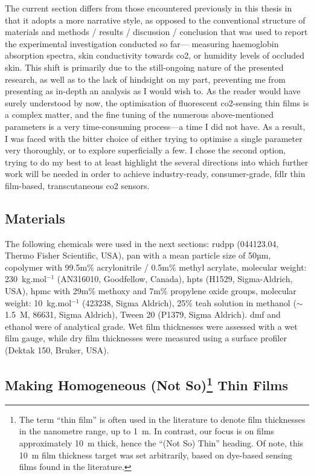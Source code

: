 The current section differs from those encountered previously in this thesis in that it adopts a more narrative style, as opposed to the conventional structure of materials and methods / results / discussion / conclusion that was used to report the experimental investigation conducted so far---\eg{} measuring haemoglobin absorption spectra, skin conductivity towards \gls{co2}, or humidity levels of occluded skin. This shift is primarily due to the still-ongoing nature of the presented research, as well as to the lack of hindsight on my part, preventing me from presenting as in-depth an analysis as I would wish to. As the reader would have surely understood by now, the optimisation of fluorescent \gls{co2}-sensing thin films is a complex matter, and the fine tuning of the numerous above-mentioned parameters is a very time-consuming process---a time I did not have. As a result, I was faced with the bitter choice of either trying to optimise a single parameter very thoroughly, or to explore superficially a few. I chose the second option, trying to do my best to at least highlight the several directions into which further work will be needed in order to achieve industry-ready, consumer-grade, \gls{fdlr} thin film-based, transcutaneous \gls{co2} sensors.

\subsection{Materials}\label{subsect:thin_film:experimental:materials}

The following chemicals were used in the next sections: \gls{rudpp} (044123.04, Thermo Fisher Scientific, USA), \gls{pan} with a mean particle size of 50µm, copolymer with 99.5m\% acrylonitrile / 0.5m\% methyl acrylate, molecular weight: 230~kg.mol$^{-1}$ (AN316010, Goodfellow, Canada), \gls{hpts} (H1529, Sigma-Aldrich, USA), \gls{hpmc} with 29m\% methoxy and 7m\% propylene oxide groups, molecular weight: 10~kg.mol$^{-1}$ (423238, Sigma Aldrich), 25\% \gls{teah} solution in methanol ($\sim$1.5~M, 86631, Sigma Aldrich), Tween 20 (P1379, Sigma Aldrich). \gls{dmf} and ethanol were of analytical grade. Wet film thicknesses were assessed with a wet film gauge, while dry film thicknesses were measured using a surface profiler (Dektak 150, Bruker, USA).

\subsection[Making Homogeneous (Not So) Thin Films]{Making Homogeneous (Not So)\protect\footnote{The term \enquote{thin film} is often used in the literature to denote film thicknesses in the nanometre range, up to 1~\textmu{}m\cite[Sect. 523-05-02]{iec62047}. In contrast, our focus is on films approximately 10~\textmu{}m thick, hence the \enquote{(Not So) Thin} heading. Of note, this 10~\textmu{}m film thickness target was set arbitrarily, based on dye-based sensing films found in the literature\cite{amao2005b, fritzsche2017, fernandezramos2019}.} Thin Films}

